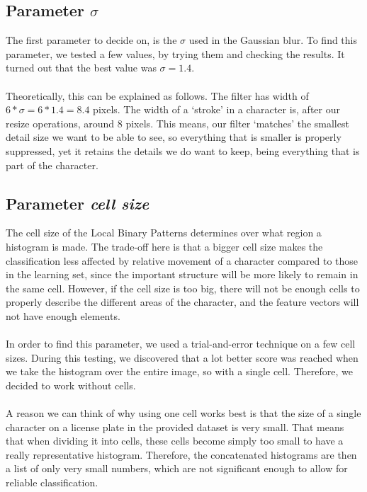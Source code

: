 \documentclass[a4paper]{article}
\begin{document}
\subsection{Parameter $\sigma$}

The first parameter to decide on, is the $\sigma$ used in the Gaussian blur. To
find this parameter, we tested a few values, by trying them and checking the
results. It turned out that the best value was $\sigma = 1.4$.\\
\\
Theoretically, this can be explained as follows. The filter has width of
$6 * \sigma = 6 * 1.4 = 8.4$ pixels. The width of a `stroke' in a character is,
after our resize operations, around 8 pixels. This means, our filter `matches'
the smallest detail size we want to be able to see, so everything that is
smaller is properly suppressed, yet it retains the details we do want to keep,
being everything that is part of the character.

\subsection{Parameter \emph{cell size}}

The cell size of the Local Binary Patterns determines over what region a
histogram is made. The trade-off here is that a bigger cell size makes the
classification less affected by relative movement of a character compared to
those in the learning set, since the important structure will be more likely to
remain in the same cell. However, if the cell size is too big, there will not
be enough cells to properly describe the different areas of the character, and
the feature vectors will not have enough elements.\\
\\
In order to find this parameter, we used a trial-and-error technique on a few
cell sizes. During this testing, we discovered that a lot better score was
reached when we take the histogram over the entire image, so with a single
cell. Therefore, we decided to work without cells.\\
\\
A reason we can think of why using one cell works best is that the size of a
single character on a license plate in the provided dataset is very small.
That means that when dividing it into cells, these cells become simply too
small to have a really representative histogram. Therefore, the
concatenated histograms are then a list of only very small numbers, which
are not significant enough to allow for reliable classification.
\end{document}
